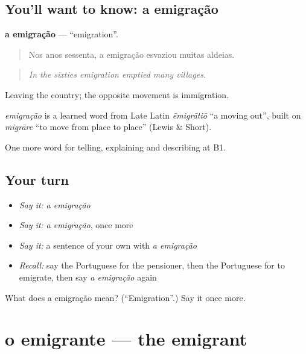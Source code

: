 \subsection*{You'll want to know: a emigração}
\textbf{a emigração} — \textquotedblleft{}emigration\textquotedblright{}.

\begin{quote}
Nos anos sessenta, a emigração esvaziou muitas aldeias.
\end{quote}

\begin{quote}
\emph{In the sixties emigration emptied many villages.}
\end{quote}

Leaving the country; the opposite movement is immigration.

\begin{cousinweb}
\emph{emigração} is a learned word from Late Latin \emph{ēmigrātiō} \textquotedblleft{}a moving out\textquotedblright{}, built on \emph{migrāre} \textquotedblleft{}to move from place to place\textquotedblright{} (Lewis \& Short).
\end{cousinweb}

\begin{grammarlens}[title={What you've built}]
One more word for telling, explaining and describing at B1.
\end{grammarlens}

\subsection*{Your turn}
\begin{itemize}
\raggedright
  \item \emph{Say it:} \emph{a emigração}
  \item \emph{Say it:} \emph{a emigração}, once more
  \item \emph{Say it:} a sentence of your own with \emph{a emigração}
  \item \emph{Recall:} say the Portuguese for the pensioner, then the Portuguese for to emigrate, then say \emph{a emigração} again
\end{itemize}

\begin{tcolorbox}[breakable,colback=teal!4,colframe=teal!35!black,title={Before you move on}]
What does a emigração mean? (\textquotedblleft{}Emigration\textquotedblright{}.) Say it once more.
\end{tcolorbox}
\section[o emigrante]{o emigrante — the emigrant}

